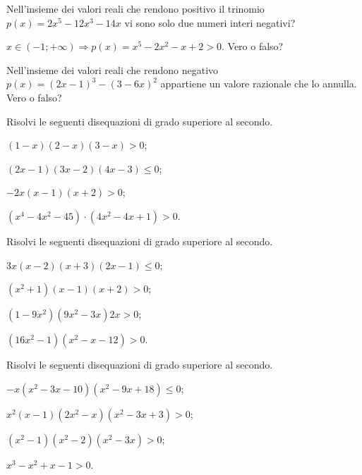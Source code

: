 \begin{esercizio}
\label{ese:4.35}
Nell'insieme dei valori reali che rendono positivo il trinomio $p(x)=2x^5-12x^3-14x$ vi sono solo due numeri interi negativi?
\end{esercizio}

\begin{esercizio}
 \label{ese:4.36}
$x\in (-1;+\infty )\Rightarrow p(x)=x^5-2x^2-x+2>0$. Vero o falso?
\end{esercizio}

\begin{esercizio}
\label{ese:4.37}
Nell'insieme dei valori reali che rendono negativo $p(x)=(2x-1)^3-(3-6x)^2$ appartiene un valore razionale che lo annulla. Vero o falso?
\end{esercizio}
\pagebreak
\begin{esercizio}[\Ast]
\label{ese:4.38}
Risolvi le seguenti disequazioni di grado superiore al secondo.
\begin{multicols}{2}
\begin{enumeratea}
\item $(1-x)(2-x)(3-x)>0$;
\item $(2x-1)(3x-2)(4x-3)\le 0$;
\item $-2x(x-1)(x+2)>0$;
\item $ \left(x^4-4x^2-45\right)\cdot \left(4x^2-4x+1\right)>0 $.
\end{enumeratea}
\end{multicols}
\end{esercizio}

\begin{esercizio}[\Ast]
\label{ese:4.39}
Risolvi le seguenti disequazioni di grado superiore al secondo.
\begin{multicols}{2}
\begin{enumeratea}
\item $3x(x-2)(x+3)(2x-1)\le 0$;
\item $\left(x^2+1\right)(x-1)(x+2)>0$;
\item $\left(1-9x^2\right)\left(9x^2-3x\right)2x>0$;
\item $\left(16x^2-1\right)\left(x^2-x-12\right)>0$.
\end{enumeratea}
\end{multicols}
\end{esercizio}

\begin{esercizio}[\Ast]
\label{ese:4.40}
Risolvi le seguenti disequazioni di grado superiore al secondo.
\begin{multicols}{2}
\begin{enumeratea}
\item $-x\left(x^2-3x-10\right)\left(x^2-9x+18\right)\le 0$;
\item $x^2(x-1)\left(2x^2-x\right)\left(x^2-3x+3\right)>0$;
\item $\left(x^2-1\right)\left(x^2-2\right)\left(x^2-3x\right)>0$;
\item $x^3-x^2+x-1>0$.
\end{enumeratea}
\end{multicols}
\end{esercizio}

